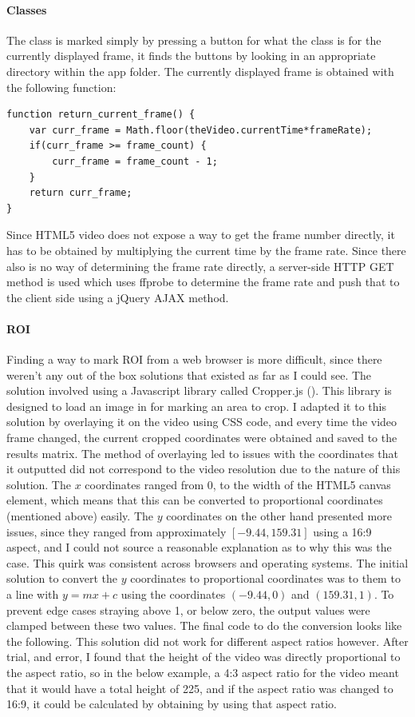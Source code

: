             \paragraph{Classes}
            The class is marked simply by pressing a button for what the class is for the currently displayed frame, it finds the buttons by looking in an appropriate directory within the app folder. The currently displayed frame is obtained with the following function:
                \begin{lstlisting}[style=JSStyle]
function return_current_frame() {
    var curr_frame = Math.floor(theVideo.currentTime*frameRate);
    if(curr_frame >= frame_count) {
        curr_frame = frame_count - 1;
    }
    return curr_frame;
}\end{lstlisting} 
            Since HTML5 video does not expose a way to get the frame number directly, it has to be obtained by multiplying the current time by the frame rate. Since there also is no way of determining the frame rate directly, a server-side HTTP GET method is used which uses ffprobe to determine the frame rate and push that to the client side using a jQuery AJAX method.

            \paragraph{ROI}
            Finding a way to mark ROI from a web browser is more difficult, since there weren't any out of the box solutions that existed as far as I could see. The solution involved using a Javascript library called Cropper.js (\cite{cropperjs}). This library is designed to load an image in for marking an area to crop. I adapted it to this solution by overlaying it on the video using CSS code, and every time the video frame changed, the current cropped coordinates were obtained and saved to the results matrix. The method of overlaying led to issues with the coordinates that it outputted did not correspond to the video resolution due to the nature of this solution. The $x$ coordinates ranged from 0, to the width of the HTML5 canvas element, which means that this can be converted to proportional coordinates (mentioned above) easily. The $y$ coordinates on the other hand presented more issues, since they ranged from approximately $[-9.44, 159.31]$ using a 16:9 aspect, and I could not source a reasonable explanation as to why this was the case. This quirk was consistent across browsers and operating systems. The initial solution to convert the $y$ coordinates to proportional coordinates was to them to a line with $y=mx+c$ using the coordinates $(-9.44,0)$ and $(159.31,1)$. To prevent edge cases straying above 1, or below zero, the output values were clamped between these two values. The final code to do the conversion looks like the following. This solution did not work for different aspect ratios however. After trial, and error, I found that the height of the video was directly proportional to the aspect ratio, so in the below example, a 4:3 aspect ratio for the video meant that it would have a total height of 225, and if the aspect ratio was changed to 16:9, it could be calculated by obtaining by using that aspect ratio.


